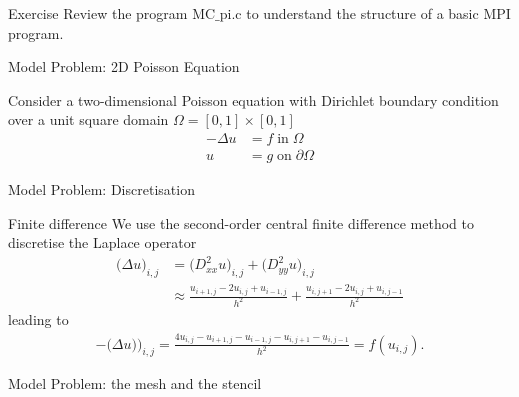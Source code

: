 \documentclass[xcolor=dvipsnames]{beamer}
\begin{document}
\begin{frame}{Exercise}
Review the program MC$\_$pi.c to understand the structure of a basic MPI program.
\end{frame}

\begin{frame}{Model Problem: 2D Poisson Equation}
\begin{block}{}
Consider a two-dimensional Poisson equation with Dirichlet boundary condition over a unit square domain $\Omega = [0,1] \times [0,1]$
\begin{align*}
-\Delta u &= f \; \text{in} \; \Omega \\
 u &= g \; \text{on} \; \partial \Omega
\end{align*}
\end{block}
\end{frame}

\begin{frame}{Model Problem: Discretisation}
\begin{block}{Finite difference}
We use the second-order central finite difference method to discretise the Laplace operator
 \begin{align*}
     \big(\Delta u\big)_{i,j} & = \big(D_{xx}^2u\big)_{i,j}+ \big(D_{yy}^2 u\big)_{i,j}\\[2ex]
     & \approx \frac{u_{i+1,j}-2u_{i,j}+u_{i-1,j}}{h^2} + \frac{u_{i,j+1}-2u_{i,j}+u_{i,j-1}}{h^2} 
 \end{align*}
leading to
\begin{align*}
    -\big(\Delta u)\big)_{i,j} = \frac{4u_{i,j}-u_{i+1,j}-u_{i-1,j}-u_{i,j+1}-u_{i,j-1}}{h^2}=f(u_{i,j}).
\end{align*}
\end{block}
\end{frame}


\begin{frame}{Model Problem: the mesh and the stencil}

\end{frame}
\end{document}

